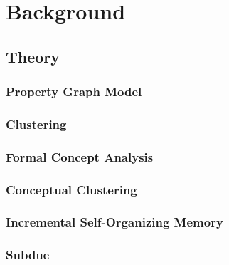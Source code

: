 \chapter{Background} 
\section{Theory}
\subsection{Property Graph Model}
\subsection{Clustering}
\subsection{Formal Concept Analysis}
\subsection{Conceptual Clustering}


\subsection{Incremental Self-Organizing Memory}

\subsection{Subdue}